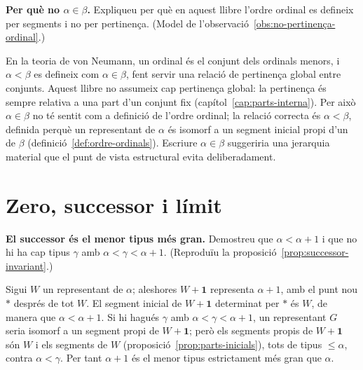 \begin{exercici}
\textbf{Per què no \(\alpha\in\beta\).} Expliqueu per què en aquest llibre l'ordre ordinal es defineix per segments i no per pertinença. (Model de l'observació~\ref{obs:no-pertinença-ordinal}.)
\end{exercici}
\begin{solucio}
En la teoria de von Neumann, un ordinal és el conjunt dels ordinals menors, i \(\alpha<\beta\) es defineix com \(\alpha\in\beta\), fent servir una relació de pertinença global entre conjunts. Aquest llibre no assumeix cap pertinença global: la pertinença és sempre relativa a una part d'un conjunt fix (capítol~\ref{cap:parts-interna}). Per això \(\alpha\in\beta\) no té sentit com a definició de l'ordre ordinal; la relació correcta és \(\alpha<\beta\), definida perquè un representant de \(\alpha\) és isomorf a un segment inicial propi d'un de \(\beta\) (definició~\ref{def:ordre-ordinals}). Escriure \(\alpha\in\beta\) suggeriria una jerarquia material que el punt de vista estructural evita deliberadament.
\end{solucio}

\section{Zero, successor i límit}\label{prac:zero-successor-limit}

\begin{exercici}
\textbf{El successor és el menor tipus més gran.} Demostreu que \(\alpha<\alpha+1\) i que no hi ha cap tipus \(\gamma\) amb \(\alpha<\gamma<\alpha+1\). (Reproduïu la proposició~\ref{prop:successor-invariant}.)
\end{exercici}
\begin{solucio}
Sigui \(W\) un representant de \(\alpha\); aleshores \(W+\mathbf1\) representa \(\alpha+1\), amb el punt nou \(\ast\) després de tot \(W\). El segment inicial de \(W+\mathbf1\) determinat per \(\ast\) és \(W\), de manera que \(\alpha<\alpha+1\). Si hi hagués \(\gamma\) amb \(\alpha<\gamma<\alpha+1\), un representant \(G\) seria isomorf a un segment propi de \(W+\mathbf1\); però els segments propis de \(W+\mathbf1\) són \(W\) i els segments de \(W\) (proposició~\ref{prop:parts-inicials}), tots de tipus \(\le\alpha\), contra \(\alpha<\gamma\). Per tant \(\alpha+1\) és el menor tipus estrictament més gran que \(\alpha\).
\end{solucio}

